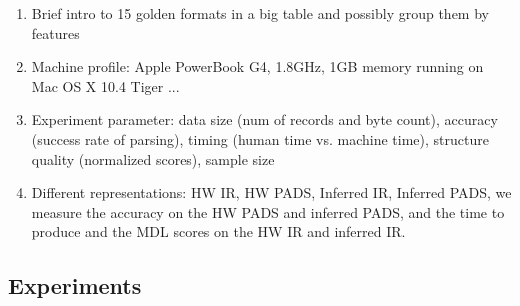 \begin{enumerate}
\item Brief intro to 15 golden formats in a big table and possibly group them by
features

\item Machine profile: Apple PowerBook G4, 1.8GHz, 1GB memory running on Mac OS X 10.4 Tiger ...

\item Experiment parameter: data size (num of records and byte count), accuracy (success rate of parsing), 
timing (human time vs. machine time), structure quality (normalized scores), sample size

\item Different representations: HW IR, HW PADS, Inferred IR, Inferred PADS, we measure
the accuracy on the HW PADS and inferred PADS, and the time to produce and the MDL scores on
the HW IR and inferred IR.
\end{enumerate}

\subsection{Experiments}

